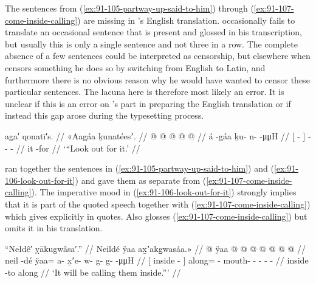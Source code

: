 The sentences from (\ref{ex:91-105-partway-up-said-to-him}) through (\ref{ex:91-107-come-inside-calling}) are missing in \citeauthor{swanton:1909}’s English translation.
\citeauthor{swanton:1909} occasionally fails to translate an occasional sentence that is present and glossed in his transcription, but usually this is only a single sentence and not three in a row.
The complete absence of a few sentences could be interpreted as censorship, but elsewhere when \citeauthor{swanton:1909} censors something he does so by switching from English to Latin, and furthermore there is no obvious reason why he would have wanted to censor these particular sentences.
The lacuna here is therefore most likely an error.
It is unclear if this is an error on \citeauthor{swanton:1909}’s part in preparing the English translation or if instead this gap arose during the typesetting process.

\ex\label{ex:91-106-look-out-for-it}%
%
\begingl
	\glpreamble	ag̣a′ qonatī′s. //
	\glpreamble	«\!Aag̱áa ḵunatéesʼ. //
	\gla	{}  @ {} {}  @ {} @ {} @ {} @ {} {} //
	\glb	{} á -g̱áa {} ḵu- n- {}  -μμH //
	\glc	{}[  - {}]
		- - \·  - //
	\gld	{} it -for {}  {} {} {} {} //
	\glft	‘“Look out for it.’
		//
\endgl
\xe

\citeauthor{swanton:1909} ran together the sentences in (\ref{ex:91-105-partway-up-said-to-him}) and (\ref{ex:91-106-look-out-for-it}) and gave them as separate from (\ref{ex:91-107-come-inside-calling}).
The imperative mood in (\ref{ex:91-106-look-out-for-it}) strongly implies that it is part of the quoted speech together with (\ref{ex:91-107-come-inside-calling}) which \citeauthor{swanton:1909} gives explicitly in quotes.
Also \citeauthor{swanton:1909} glosses (\ref{ex:91-107-come-inside-calling}) but omits it in his translation.

\ex\label{ex:91-107-come-inside-calling}%
%
\begingl
	\glpreamble	“Nełdê′ ỵākugwâsa′.” //
	\glpreamble	Neildé ÿaa ax̱ʼakg̱wasáa.\!» //
	\gla	{}  @ {} {}
		ÿaa @  @ {} @ {} @ {} @ {} @ {} @ {} //
	\glb	{} neil -dé {}
		ÿaa= a- x̱ʼe- w- g- g̱-  -μμH //
	\glc	{}[ inside - {}]
		along= - mouth- - - -  - //
	\gld	{} inside -to {}
		along  {} {} {} {} {} {} //
	\glft	‘It will be calling them inside.”’
		//
\endgl
\xe

